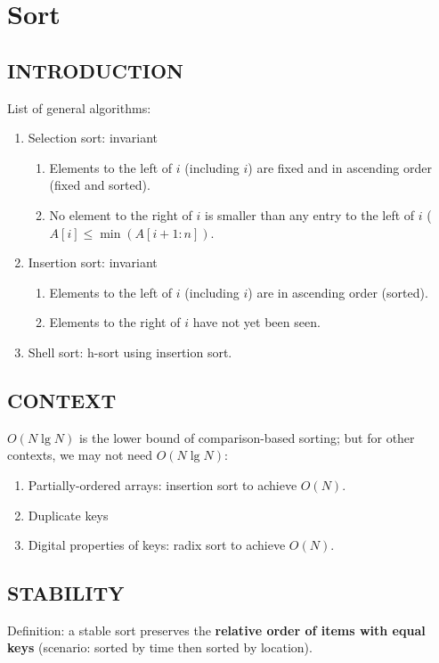 \chapter{Sort}


\section{INTRODUCTION}
List of general algorithms:
\begin{enumerate}
\item Selection sort: invariant
\begin{enumerate}
\item Elements to the left of $i$ (including $i$) are fixed and in ascending order (fixed and sorted).
\item No element to the right of $i$ is smaller than any entry to the left of $i$ ($A[i]  \leq\min(A[i+1:n])$.
\end{enumerate}
\item Insertion sort: invariant
\begin{enumerate}
\item Elements to the left of $i$ (including $i$) are in ascending order (sorted).
\item Elements to the right of $i$ have not yet been seen.
\end{enumerate}
\item Shell sort: h-sort using insertion sort.
\end{enumerate}


\section{CONTEXT}
$O(N\lg N)$ is the lower bound of comparison-based sorting; but for other contexts, we may not need $O(N \lg N)$:
\begin{enumerate}
\item Partially-ordered arrays: insertion sort to achieve $O(N)$.
\item Duplicate keys
\item Digital properties of keys: radix sort to achieve $O(N)$.
\end{enumerate}
\section{STABILITY}
Definition: a stable sort preserves the \textbf{relative order of items with equal keys} (scenario: sorted by time then sorted by location). 

